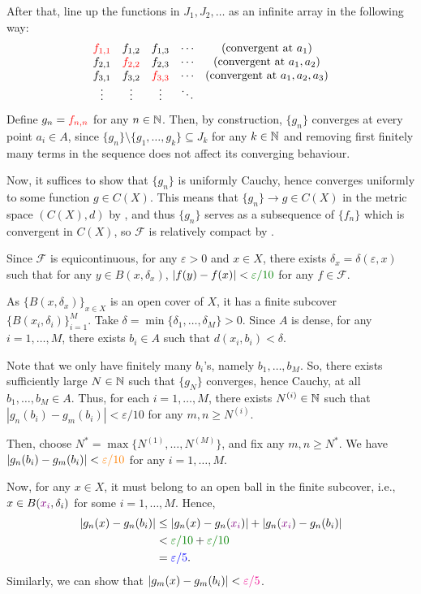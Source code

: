 \begin{enumerate}
\begin{pf}
After that, line up the functions in \(J_1,J_2,\dotsc\) as an infinite array in
the following way:
\[
\begin{array}{ccccc}
{\color{red}f_{1,1}}&f_{1,2}&f_{1,3}&\cdots&\text{(convergent at \(a_1\))} \\
f_{2,1}&{\color{red}f_{2,2}}&f_{2,3}&\cdots &\text{(convergent at \(a_1,a_2\))}\\
f_{3,1}&f_{3,2}&{\color{red}f_{3,3}}&\cdots &\text{(convergent at \(a_1,a_2,a_3\))}\\
\vdots&\vdots&\vdots&\ddots
\end{array}
\]
Define \(g_n={\color{red}f_{n,n}}\) for any \(n\in\mathbb{N}\). Then, by construction,
\(\{g_n\}\) converges at every point \(a_i\in A\), since
\(\{g_n\}\setminus\{g_1,\dotsc,g_k\}\subseteq J_k\) for any \(k\in\mathbb{N}\) and
removing first finitely many terms in the sequence does not affect its
converging behaviour.

Now, it suffices to show that \(\{g_n\}\) is uniformly Cauchy, hence converges
uniformly to some function \(g\in C(X)\). This means that \(\{g_n\}\to g\in
C(X)\) in the metric space \((C(X),d)\) by , and
thus \(\{g_n\}\) serves as a subsequence of \(\{f_n\}\) which is convergent in
\(C(X)\), so \(\mathcal{F}\) is relatively compact by
.

Since \(\mathcal{F}\) is equicontinuous, for any \(\varepsilon>0\) and \(x\in
X\), there exists \(\delta_x=\delta(\varepsilon,x)\) such that for any \(y\in
B(x,\delta_x)\), \(|f(y)-f(x)|<\gc{\varepsilon/10}\) for any \(f\in\mathcal{F}\).

As \(\{B(x,\delta_x)\}_{x\in X}\) is an open cover of \(X\), it has a finite
subcover \(\{B(x_i,\delta_i)\}_{i=1}^{M}\). Take
\(\delta=\min\{\delta_1,\dotsc,\delta_M\}>0\). Since \(A\) is dense, for any
\(i=1,\dotsc,M\), there exists \(b_i\in A\) such that \(d(x_i,b_i)<\delta\).

Note that we only have finitely many \(b_i\)'s, namely \(b_1,\dotsc,b_M\). So,
there exists sufficiently large \(N\in\mathbb{N}\) such that \(\{g_N\}\) converges,
hence Cauchy, at all \(b_1,\dotsc,b_M\in A\). Thus, for each \(i=1,\dotsc,M\),
there exists \(N^{(i)}\in\mathbb{N}\) such that
\(|g_n(b_i)-g_m(b_i)|<\varepsilon/10\) for any \(m,n\ge N^{(i)}\).

Then, choose \(N^*=\max\{N^{(1)},\dotsc,N^{(M)}\}\), and fix any \(m,n\ge
N^*\). We have \(|g_n(b_i)-g_m(b_i)|<{\color{orange}\varepsilon/10}\) for any \(i=1,\dotsc,M\).

Now, for any \(x\in X\), it must belong to an open ball in the finite subcover,
i.e., \(x\in B({\color{violet}x_i},\delta_i)\) for some \(i=1,\dotsc,M\). Hence,
\begin{align*}
|g_n(x)-g_n(b_i)|&\le|g_n(x)-g_n(\vc{x_i})|+|g_n(\vc{x_i})-g_n(b_i)| \\
&<\gc{\varepsilon/10}+\gc{\varepsilon/10} \\
&=\blc{\varepsilon/5}.
\end{align*}
Similarly, we can show that \(|g_m(x)-g_m(b_i)|<{\color{magenta}\varepsilon/5}\).


\end{pf}
\end{enumerate}
